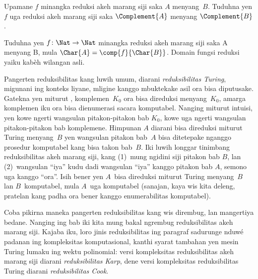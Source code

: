 \documentclass[../../../include/open-logic-section]{subfiles}
\begin{document}
\begin{prob}
Upamane $f$ minangka reduksi akeh
marang siji saka $A$ menyang~$B$.
Tuduhna yen $f$ uga reduksi akeh
marang siji saka $\Complement{A}$
menyang $\Complement{B}$.
\end{prob}

\begin{prob}
%
Tuduhna yen $f\colon \Nat \to \Nat$
minangka reduksi akeh marang siji saka A menyang B,
mula $\Char{A}
= \comp{f}{\Char{B}}$. Domain fungsi reduksi yaiku kabèh wilangan asli.
\end{prob}

\begin{digress}
Pangerten reduksibilitas kang luwih
umum, diarani \emph{reduksibilitas
Turing}, migunani ing konteks liyane,
mligine kanggo mbuktekake asil
ora bisa diputusake. Gatekna yen
miturut ,
komplemen~$K_0$ ora bisa direduksi
menyang~$K_0$, amarga komplemen iku
ora bisa dienumerasi sacara komputabel.
Nanging miturut intuisi, yen kowe
ngerti wangsulan pitakon-pitakon bab
$K_0$, kowe uga ngerti wangsulan
pitakon-pitakon bab komplemene.
Himpunan $A$ diarani bisa direduksi
miturut Turing menyang~$B$ yen
wangsulan pitakon bab~$A$ bisa
ditetepake nganggo prosedur komputabel
kang bisa takon bab~$B$. Iki luwih
longgar tinimbang reduksibilitas akeh
marang siji, kang (1)~mung ngidini
siji pitakon bab $B$, lan (2)~wangsulan
``iya'' kudu dadi wangsulan ``iya''
kanggo pitakon bab $A$, semono uga
kanggo ``ora''. Isih bener yen
$A$~bisa direduksi miturut Turing
menyang~$B$ lan $B$~komputabel,
mula $A$~uga komputabel (sanajan,
kaya wis kita deleng, pratelan
kang padha ora bener kanggo
enumerabilitas komputabel).

Coba pikirna maneka pangerten
reduksibilitas kang wis dirembug,
lan mangertiya bedane. Nanging ing
bab iki kita mung bakal ngrembug
reduksibilitas akeh marang siji.
Kajaba iku, loro jinis reduksibilitas
ing paragraf sadurunge nduwé padanan
ing kompleksitas komputasional, kanthi
syarat tambahan yen mesin Turing
lumaku ing wektu polinomial: versi
kompleksitas reduksibilitas akeh marang
siji diarani \emph{reduksibilitas Karp},
dene versi kompleksitas reduksibilitas
Turing diarani \emph{reduksibilitas Cook}.
\end{digress}
\end{document}

